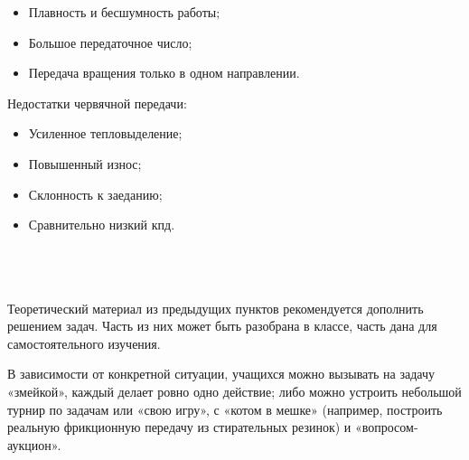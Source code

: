 \begin{itemize}
	\item Плавность и бесшумность работы;
	\item Большое передаточное число;
	\item Передача вращения только в одном направлении.\\
\end{itemize}
Недостатки червячной передачи:

\begin{itemize}
	\item Усиленное тепловыделение;
	\item Повышенный износ;
	\item Склонность к заеданию;
	\item Сравнительно низкий кпд.\\\\
\end{itemize}

{\hypertarget{lesson5x4}{}}\\\\

Теоретический материал из предыдущих пунктов рекомендуется дополнить решением задач. Часть из них может быть разобрана в классе, часть дана для самостоятельного изучения.

В зависимости от конкретной ситуации, учащихся можно вызывать на задачу «змейкой», каждый делает ровно одно действие; либо можно устроить небольшой турнир по задачам или «свою игру», с «котом в мешке» (например, построить реальную фрикционную передачу из стирательных резинок) и «вопросом-аукцион».\\\\

